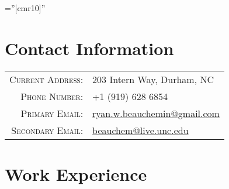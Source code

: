 \documentclass[a4paper,10pt]{article} %
\begin{document}
\pagestyle{empty} %

\font\fb=''[cmr10]'' %


\par{\bigskip\par} %

\section{Contact Information}

\begin{tabular}{rl}
\textsc{Current Address:} & 203 Intern Way, Durham, NC \\
\textsc{Phone Number:} & +1 (919) 628 6854\\
\textsc{Primary Email:} & \href{mailto:ryan.w.beauchemin@gmail.com}{ryan.w.beauchemin@gmail.com}\\
\textsc{Secondary Email:} & \href{mailto:beauchem@live.unc.edu}{beauchem@live.unc.edu}
\end{tabular}



\section{Work Experience}
\end{document}
